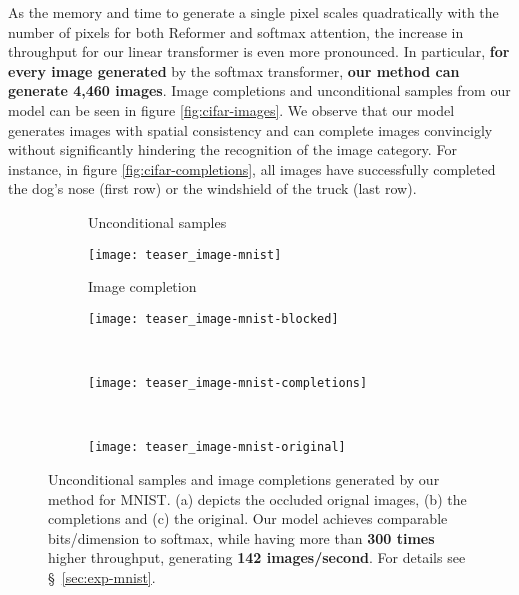 \documentclass{article}
\begin{document}
As the memory and time to generate a single pixel scales quadratically with the
number of pixels for both Reformer and softmax attention, the increase in
throughput for our linear transformer is even more pronounced. In particular,
\textbf{for every image generated} by the softmax transformer, \textbf{our
method can generate 4,460 images}. Image completions and unconditional samples
from our model can be seen in figure \ref{fig:cifar-images}. We observe that
our model generates images with spatial consistency and can complete images
convincigly without significantly hindering the recognition of the image
category. For instance, in figure \ref{fig:cifar-completions}, all images have
successfully completed the dog's nose (first row) or the windshield of the
truck (last row).

\begin{figure}[h]
    \centering
    \begin{subfigure}[t]{0.9\columnwidth}
        \centering
        Unconditional samples
    \end{subfigure}
    \begin{subfigure}[t]{0.9\columnwidth}
        \texttt{[image: teaser\_image-mnist]}
        \vspace{0.3em}
    \end{subfigure}
    \begin{subfigure}[t]{0.9\columnwidth}
        \centering
        Image completion
    \end{subfigure}
    \begin{subfigure}[t]{0.0971\columnwidth}
        \texttt{[image: teaser\_image-mnist-blocked]}
        \caption{}
    \end{subfigure}\,\,
    \begin{subfigure}[t]{0.6\columnwidth}
        \texttt{[image: teaser\_image-mnist-completions]}
        \caption{}
    \end{subfigure}\,\,
    \begin{subfigure}[t]{0.0971\columnwidth}
        \texttt{[image: teaser\_image-mnist-original]}
        \caption{}
    \end{subfigure}
    \caption{Unconditional samples and image completions generated by our
             method for MNIST. (a) depicts the occluded orignal images, (b) the
             completions and (c) the original. Our model achieves comparable
             bits/dimension to softmax, while having more than
             \textbf{300 times} higher throughput, generating \textbf{142
             images/second}. For details see \S~\ref{sec:exp-mnist}.}
    \label{fig:mnist-images}
\end{figure}
\end{document}
